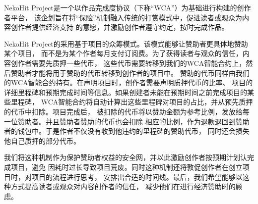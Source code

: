 NekoHit Project是一个以作品完成度协议（下称“WCA”）为基础进行构建的创作者平台，
该企划旨在将“保险”机制融入传统的打赏模式中，促进读者或观众为内容创作者提供经济支持
的意愿，并激励创作者遵守约定，按时完成作品。

NekoHit Project的采用基于项目的众筹模式。该模式能够让赞助者更具体地赞助某个项目，
而不是为某个作者每月支付订阅费。为了获得读者与观众的信任，内容创作者需要先质押一些代币，
这些代币需要转移到我们的WCA智能合约上，然后赞助者才能将用于赞助的代币转移到创作者的项目中。
赞助的代币同样由我们的WCA智能合约持有。在声明项目时，创作者需要声明质押代币的比率、
项目的详细里程碑和预期完成时间等信息。如果创建者未能在预期时间之前完成项目的某些里程碑，
WCA智能合约将自动计算出这些里程碑对项目的占比，并从预先质押的代币中扣除。项目完成后，
被扣除的代币将以赞助金额为参考比例，发放给每一位赞助者。并且赞助者赞助的代币也会扣除
相应的比例，作为退款退回到赞助者的钱包中。于是作者不仅没有收到他违约的里程碑的赞助代币，
同时还会损失他自己质押的部分代币。

我们将这种机制作为保护赞助者权益的安全网，并以此激励创作者按预期计划认完成项目，避免
因耗时过长导致项目荒废。同时这种机制还将敦促创作者在创立项目时，对项目的流程进行思考，
安排出合适的时间线。最后，我们希望能够以这种方式提高读者或观众对内容创作者的信任，
减少他们在进行经济赞助时的顾虑。
